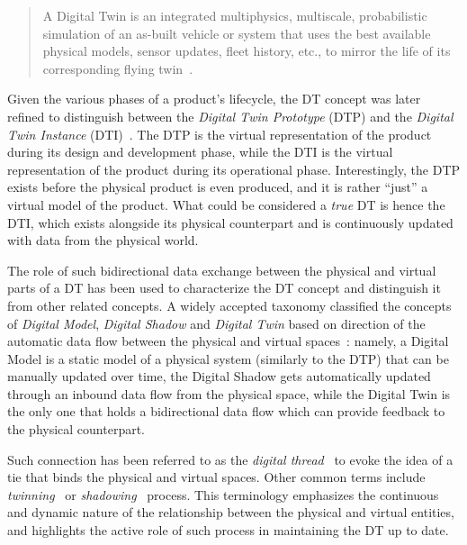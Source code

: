\begin{quote}
    A Digital Twin is an integrated multiphysics, multiscale, probabilistic simulation of an as-built vehicle or system that uses the best available physical models, sensor updates, fleet history, etc., to mirror the life of its corresponding flying twin~\cite{glaessgen2012dtnasa}.
\end{quote}

Given the various phases of a product's lifecycle, the \ac{DT} concept was later
refined to distinguish between the \emph{Digital Twin Prototype} (DTP) and the \emph{Digital Twin Instance} (DTI)~\cite{Grieves2017}.
The DTP is the virtual representation of the product during its design and development phase,
while the DTI is the virtual representation of the product during its operational phase.
%
Interestingly, the DTP exists before the physical product is even produced, 
and it is rather ``just'' a virtual model of the product. 
%
What could be considered a \emph{true} \ac{DT} is hence the DTI, which exists alongside its physical counterpart and is continuously updated with data from the physical world. 

The role of such bidirectional data exchange between the physical and virtual parts
of a \ac{DT} has been used to characterize the \ac{DT} concept and distinguish it from other related concepts.
%
A widely accepted taxonomy classified the concepts of \emph{Digital Model}, \emph{Digital Shadow} and \emph{Digital Twin} based on direction of the automatic data flow between the physical and virtual spaces~\cite{kritzinger2018dtmanufacturing}:
namely, 
a Digital Model is a static model of a physical system (similarly to the DTP) that can be manually updated over time,
the Digital Shadow gets automatically updated through an inbound data flow from the physical space,
while the Digital Twin is the only one that holds a bidirectional data flow which can provide feedback to the physical counterpart.


Such connection has been referred to as the \emph{digital thread}~\cite{Singh_Willcox_2018,Grieves_2023} to evoke the idea of a tie that binds the physical and virtual spaces.
%
Other common terms include \emph{twinning}~\cite{JONES202036} or \emph{shadowing}~\cite{Jiang_Yin_Li_Luo_Kaynak_2021,web-of-dt-ricci-2022} process. 
%
This terminology emphasizes the continuous and dynamic nature of the relationship between the physical and virtual entities, 
and highlights the active role of such process in maintaining the \ac{DT} up to date.

